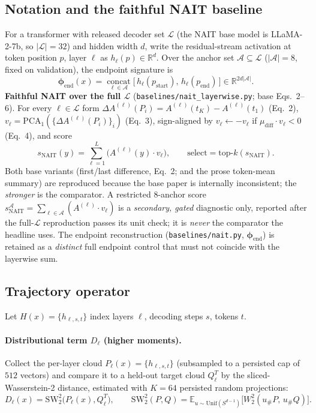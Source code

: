 \documentclass[11pt]{article}
\theoremstyle{definition}
\newcommand{\phend}{\bm{\phi}_{\mathrm{end}}}
\newcommand{\R}{\mathbb{R}}
\newcommand{\E}{\mathbb{E}}
\newcommand{\sw}{\mathrm{SW}_2^2}
\newcommand{\Aset}{\mathcal{A}}
\newcommand{\Lset}{\mathcal{L}}
\begin{document}
\subsection{Notation and the faithful NAIT baseline}
For a transformer with released decoder set $\Lset$ (the NAIT base model is LLaMA-2-7b,
so $|\Lset|=32$) and hidden width $d$, write the residual-stream activation at token
position $p$, layer $\ell$ as $h_\ell(p)\in\R^d$. Over the anchor set $\Aset\subseteq
\Lset$ ($|\Aset|=8$, fixed on validation), the endpoint signature is
\begin{equation}
\phend(x)=\operatorname*{concat}_{\ell\in\Aset}\big[\,h_\ell(p_{\mathrm{start}}),\,h_\ell(p_{\mathrm{end}})\,\big]\in\R^{2d|\Aset|}.
\label{eq:phiend}
\end{equation}
\textbf{Faithful NAIT over the full $\Lset$} (\texttt{baselines/nait\_layerwise.py};
base Eqs.~2--6). For every $\ell\in\Lset$ form $\Delta A^{(\ell)}(P_i)=A^{(\ell)}(t_K)-
A^{(\ell)}(t_1)$ (Eq.~2), $v_\ell=\mathrm{PCA}_1(\{\Delta A^{(\ell)}(P_i)\}_i)$ (Eq.~3),
sign-aligned by $v_\ell\leftarrow-v_\ell$ if $\mu_{\mathrm{diff}}\cdot v_\ell<0$ (Eq.~4),
and score
\begin{equation}
s_{\mathrm{NAIT}}(y)=\sum_{\ell=1}^{L}\big(A^{(\ell)}(y)\cdot v_\ell\big),\qquad
\mathrm{select}=\mathrm{top\text{-}}k(s_{\mathrm{NAIT}}).
\label{eq:nait}
\end{equation}
Both base variants (first/last difference, Eq.~2; and the prose token-mean summary) are
reproduced because the base paper is internally inconsistent; the \emph{stronger} is the
comparator. A restricted 8-anchor score $s_{\mathrm{NAIT}}^{\Aset}=\sum_{\ell\in\Aset}
(A^{(\ell)}\cdot v_\ell)$ is a \emph{secondary, gated} diagnostic only, reported after the
full-$\Lset$ reproduction passes its unit check; it is \emph{never} the comparator the
headline uses. The endpoint reconstruction (\texttt{baselines/nait.py}, $\phend$) is
retained as a \emph{distinct} full endpoint control that must not coincide with the
layerwise sum.

\subsection{Trajectory operator}
Let $H(x)=\{h_{\ell,s,t}\}$ index layers $\ell$, decoding steps $s$, tokens $t$.

\paragraph{Distributional term $D_\ell$ (higher moments).}
Collect the per-layer cloud $P_\ell(x)=\{h_{\ell,s,t}\}$ (subsampled to a persisted cap
of $512$ vectors) and compare it to a held-out target cloud $Q_\ell^T$ by the
sliced-Wasserstein-2 distance, estimated with $K{=}64$ persisted random projections:
\begin{equation}
D_\ell(x)=\sw\!\big(P_\ell(x),Q_\ell^T\big),\qquad
\sw(P,Q)=\E_{u\sim\mathrm{Unif}(S^{d-1})}\!\big[W_2^2(u_\#P,\,u_\#Q)\big].
\label{eq:sw2}
\end{equation}
\end{document}
